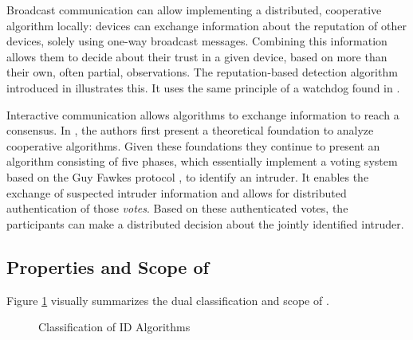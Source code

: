 \documentclass[conference]{IEEEtran}
\begin{document}
\begin{LaTeXdescription}

  \item[Broadcast communication] can allow implementing a distributed,
  cooperative algorithm locally: devices can exchange information about the
  reputation of other devices, solely using one-way broadcast messages.
  Combining this information allows them to decide about their trust in a given
  device, based on more than their own, often partial, observations. The
  reputation-based detection algorithm introduced in
  \cite{ganeriwal2008reputation} illustrates this. It uses the same principle
  of a watchdog found in \cite{mishra2004intrusion}.

  \item[Interactive communication] allows algorithms to exchange information to
  reach a consensus. In \cite{krontiris2009cooperative}, the authors first
  present a theoretical foundation to analyze cooperative algorithms. Given
  these foundations they continue to present an algorithm consisting of five
  phases, which essentially implement a voting system based on the Guy Fawkes
  protocol \cite{anderson1998new}, to identify an intruder. It enables the
  exchange of suspected intruder information and allows for distributed
  authentication of those \emph{votes}. Based on these authenticated votes, the
  participants can make a distributed decision about the jointly identified
  intruder.

\end{LaTeXdescription}

\subsection{Properties and Scope of \NAME}
\label{scope}

Figure \ref{fig:classification} visually summarizes the dual classification and
scope of \NAME.

\begin{figure}[ht]
  \centering
  \caption{Classification of ID Algorithms}
  \label{fig:classification}
\end{figure}
\end{document}
